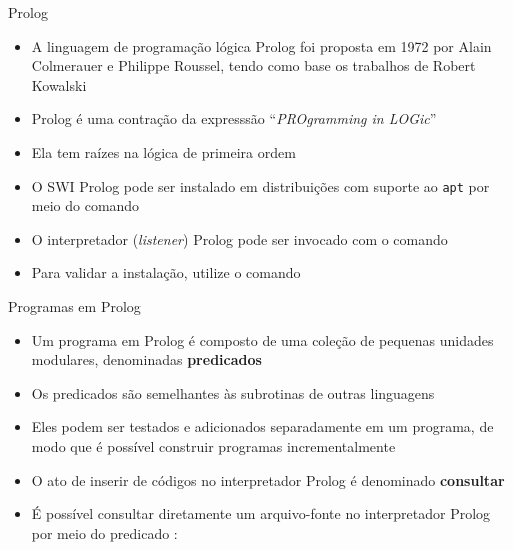 \begin{frame}[fragile]{Prolog}

    \begin{itemize}
        \item A linguagem de programação lógica Prolog foi proposta em 1972 por 
           Alain Colmerauer e Philippe Roussel, tendo como base os trabalhos de Robert Kowalski 

        \item Prolog é uma contração da expresssão ``\textit{PROgramming in LOGic}''

        \item Ela tem raízes na lógica de primeira ordem

        \item O SWI Prolog pode ser instalado em distribuições com suporte ao
            \texttt{apt} por meio do comando


        \item O interpretador (\textit{listener}) Prolog pode ser invocado com o comando


        \item Para validar a instalação, utilize o comando

    \end{itemize}

\end{frame}

\begin{frame}[fragile]{Programas em Prolog}

    \begin{itemize}

        \item Um programa em Prolog é composto de uma coleção de pequenas unidades modulares, 
            denominadas \textbf{predicados}

        \item Os predicados são semelhantes às subrotinas de outras linguagens

        \item Eles podem ser testados e adicionados separadamente em um programa, de modo que 
            é possível construir programas incrementalmente

        \item O ato de inserir de códigos no interpretador Prolog é denominado
            \textbf{consultar}

        \item É possível consultar diretamente um arquivo-fonte no interpretador Prolog por
            meio do predicado :


    \end{itemize}

\end{frame}


